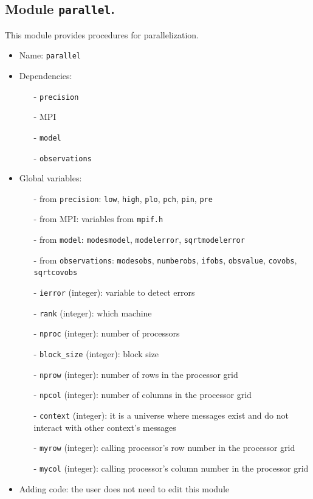\documentclass[12pt]{article}
\begin{document}
\subsection{Module {\tt parallel}.}
This module provides procedures for parallelization.
\begin{itemize}
\item Name: {\tt parallel}
\item Dependencies: 
\begin{itemize}
\item[-] {\tt precision}
\item[-] MPI
\item[-] {\tt model} 
\item[-] {\tt observations}
\end{itemize}
\item Global variables: 
\begin{itemize}
\item[-] from {\tt precision}: {\tt low}, {\tt high}, {\tt plo}, {\tt pch}, {\tt pin}, {\tt pre} 
\item[-] from MPI: variables from {\tt mpif.h}
\item[-] from {\tt model}: {\tt modesmodel}, {\tt modelerror}, {\tt sqrtmodelerror}
\item[-] from {\tt observations}: {\tt modesobs}, {\tt numberobs}, {\tt ifobs}, {\tt obsvalue}, {\tt covobs}, {\tt sqrtcovobs}
\item[-] {\tt ierror} (integer): variable to detect errors
\item[-] {\tt rank} (integer): which machine
\item[-] {\tt nproc} (integer): number of processors
\item[-] {\tt block\_size} (integer): block size
\item[-] {\tt nprow} (integer): number of rows in the processor grid
\item[-] {\tt npcol} (integer): number of columns in the processor grid
\item[-] {\tt context} (integer): it is a universe where messages exist and do not interact with other context's messages
\item[-] {\tt myrow} (integer): calling processor's row number in the processor grid 
\item[-] {\tt mycol} (integer): calling processor's column number in the processor grid 
\end{itemize}
\item Adding code: the user does not need to edit this module
\end{itemize}
\end{document}
